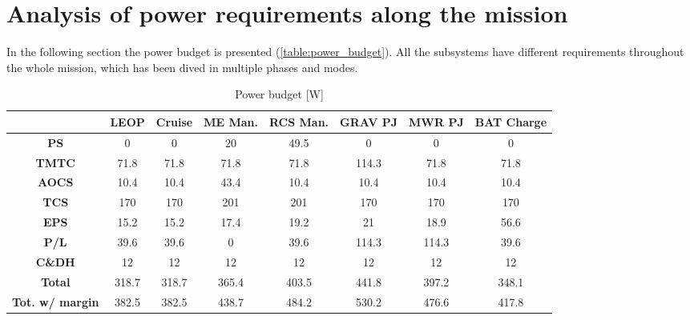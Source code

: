 \section{Analysis of power requirements along the mission}
\label{sec:EPS_phases}

In the following section the power budget is presented (\autoref{table:power_budget}). All the subsystems have different requirements throughout the whole mission, which has been dived in multiple phases and modes.

\begin{table}[H]
    \renewcommand{\arraystretch}{1.4}
    \centering
    \small
    \begin{tabular}{|c|c|c|c|c|c|c|c|}
        \hline
        & \textbf{LEOP} & \textbf{Cruise} & \textbf{ME Man.} & \textbf{RCS Man.} & \textbf{GRAV PJ} & \textbf{MWR PJ} & \textbf{BAT Charge} \\
        \hline
        \hline
        \textbf{PS} & 0 & 0 & 20 & 49.5 & 0 & 0 & 0 \\
        \hline
        \textbf{TMTC} & 71.8 & 71.8 & 71.8 & 71.8 & 114.3 & 71.8 & 71.8 \\
        \hline
        \textbf{AOCS} & 10.4 & 10.4 & 43.4 & 10.4 & 10.4 & 10.4 & 10.4 \\
        \hline
        \textbf{TCS} & 170 & 170 & 201 & 201 & 170 & 170 & 170 \\
        \hline
        \textbf{EPS} & 15.2 & 15.2 & 17.4 & 19.2 & 21 & 18.9 & 56.6 \\
        \hline
        \textbf{P/L} & 39.6 & 39.6 & 0 & 39.6 & 114.3 & 114.3 & 39.6 \\
        \hline
        \textbf{C\&DH} & 12 & 12 & 12 & 12 & 12 & 12 & 12 \\
        \hline
        \hline
        \textbf{Total} & 318.7 & 318.7 & 365.4 & 403.5 & 441.8 & 397.2 & 348.1 \\
        \hline
        \textbf{Tot. w/ margin} & 382.5 & 382.5 & 438.7 & 484.2 & 530.2 & 476.6 & 417.8 \\
        \hline
    \end{tabular}
    \caption{Power budget [W]}
    \label{table:power_budget}
\end{table}  

\vspace{-3mm}

